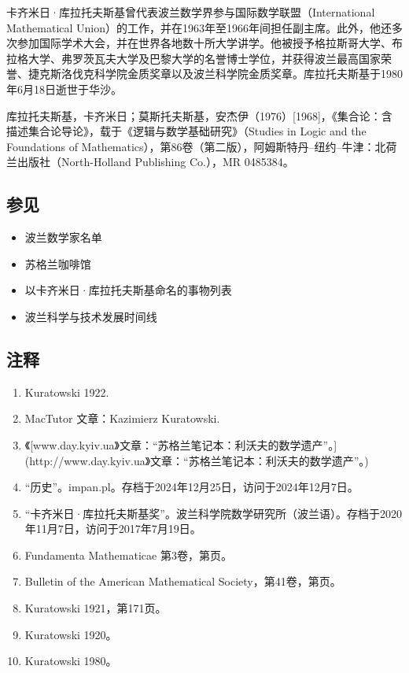 卡齐米日·库拉托夫斯基曾代表波兰数学界参与国际数学联盟（International Mathematical Union）的工作，并在1963年至1966年间担任副主席。此外，他还多次参加国际学术大会，并在世界各地数十所大学讲学。他被授予格拉斯哥大学、布拉格大学、弗罗茨瓦夫大学及巴黎大学的名誉博士学位，并获得波兰最高国家荣誉、捷克斯洛伐克科学院金质奖章以及波兰科学院金质奖章。库拉托夫斯基于1980年6月18日逝世于华沙。

库拉托夫斯基，卡齐米日；莫斯托夫斯基，安杰伊（1976）[1968]，《集合论：含描述集合论导论》，载于《逻辑与数学基础研究》（Studies in Logic and the Foundations of Mathematics），第86卷（第二版），阿姆斯特丹–纽约–牛津：北荷兰出版社（North-Holland Publishing Co.），MR 0485384。
\subsection{参见}
\begin{itemize}
\item 波兰数学家名单
\item 苏格兰咖啡馆
\item 以卡齐米日·库拉托夫斯基命名的事物列表
\item 波兰科学与技术发展时间线
\end{itemize}
\subsection{注释}
\begin{enumerate}
\item Kuratowski 1922.
\item MacTutor 文章：Kazimierz Kuratowski.
\item 《[www.day.kyiv.ua》文章：“苏格兰笔记本：利沃夫的数学遗产”。](http://www.day.kyiv.ua》文章：“苏格兰笔记本：利沃夫的数学遗产”。)
\item “历史”。impan.pl。存档于2024年12月25日，访问于2024年12月7日。
\item “卡齐米日·库拉托夫斯基奖”。波兰科学院数学研究所（波兰语）。存档于2020年11月7日，访问于2017年7月19日。
\item Fundamenta Mathematicae 第3卷，第页。
\item Bulletin of the American Mathematical Society，第41卷，第页。
\item Kuratowski 1921，第171页。
\item Kuratowski 1920。
\item Kuratowski 1980。
\end{enumerate}
